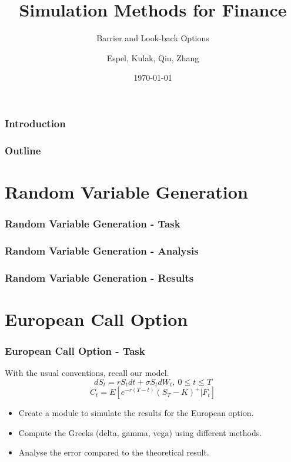 \documentclass[11pt]{beamer}
\title{Simulation Methods for Finance}
\subtitle{Barrier and Look-back Options}
\author{Espel, Kulak, Qiu, Zhang}
\institute{Imperial College London}
\date{\today}
\begin{document}
\begin{frame}
    \titlepage
\end{frame}


\begin{frame}
\frametitle{Introduction}

\end{frame}



\begin{frame}
\frametitle{Outline}
\tableofcontents
\end{frame}


\section{Random Variable Generation}
\begin{frame}
\frametitle{Random Variable Generation - Task}

\end{frame}

\begin{frame}
\frametitle{Random Variable Generation - Analysis}

\end{frame}

\begin{frame}
\frametitle{Random Variable Generation - Results}

\end{frame}



\section{European Call Option}
\begin{frame}
\frametitle{European Call Option - Task}

With the usual conventions, recall our model.
$$dS_t=rS_tdt+\sigma S_tdW_t, \ 0\leq t \leq T$$
$$C_t = E[e^{-r(T-t)}(S_T-K)^+|\textit{F}_t]$$

\begin{itemize}
  \item Create a module to simulate the results for the European option.
  \item Compute the Greeks (delta, gamma, vega) using different methods.
  \item Analyse the error compared to the theoretical result.
\end{itemize}
\end{frame}
\end{document}
